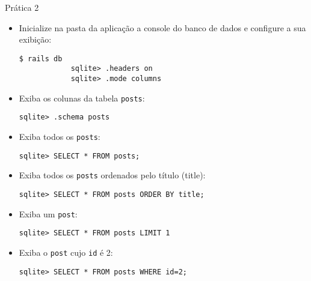 \begin{frame}{Prática 2}
	\begin{itemize}
		\item Inicialize \alert{na pasta da aplicação} a console do banco de dados e
		configure a sua exibição:
		\begin{lstlisting}[style=BashInputBasicStyle]
			$ rails db
			sqlite> .headers on
			sqlite> .mode columns
		\end{lstlisting}
		
		\item Exiba os colunas da tabela \verb|posts|:
		\begin{lstlisting}[style=BashInputBasicStyle]
			sqlite> .schema posts
		\end{lstlisting}
		
		\framebreak
		\item Exiba todos os \verb|posts|:
		\begin{lstlisting}[style=BashInputBasicStyle]
			sqlite> SELECT * FROM posts;
		\end{lstlisting}
		
		\item Exiba todos os \verb|posts| ordenados pelo título (title):
		\begin{lstlisting}[style=BashInputBasicStyle]
			sqlite> SELECT * FROM posts ORDER BY title;
		\end{lstlisting}
		
		\item Exiba um \verb|post|:
		\begin{lstlisting}[style=BashInputBasicStyle]
			sqlite> SELECT * FROM posts LIMIT 1
		\end{lstlisting}
		
		\item Exiba o \verb|post| cujo \verb|id| é 2:
		\begin{lstlisting}[style=BashInputBasicStyle]
			sqlite> SELECT * FROM posts WHERE id=2;
		\end{lstlisting}
	\end{itemize}
\end{frame}